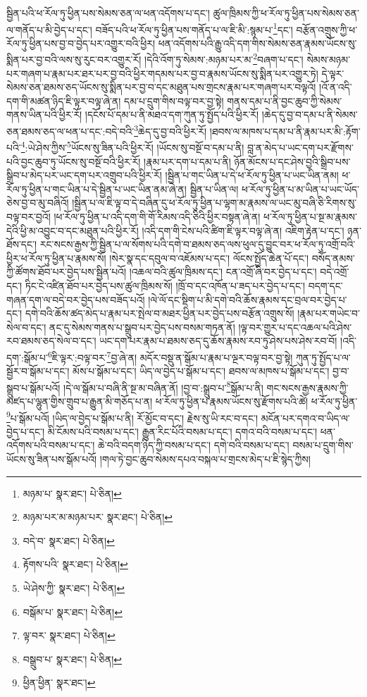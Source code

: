 སྦྱིན་པའི་ཕ་རོལ་ཏུ་ཕྱིན་པས་སེམས་ཅན་ལ་ཕན་འདོགས་པ་དང་། ཚུལ་ཁྲིམས་ཀྱི་ཕ་རོལ་ཏུ་ཕྱིན་པས་སེམས་ཅན་ལ་གནོད་པ་མི་བྱེད་པ་དང་། བཟོད་པའི་ཕ་རོལ་ཏུ་ཕྱིན་པས་གནོད་པ་ལ་ཇི་མི་:སྙམ་པ་\footnote{མཉམ་པ་  སྣར་ཐང་།  པེ་ཅིན། }དང་། བརྩོན་འགྲུས་ཀྱི་ཕ་རོལ་ཏུ་ཕྱིན་པས་བྱ་བ་བྱེད་པར་འགྱུར་བའི་ཕྱིར། ཕན་འདོགས་པའི་རྒྱུ་འདི་དག་གིས་སེམས་ཅན་རྣམས་ཡོངས་སུ་སྨིན་པར་བྱ་བའི་ལས་སུ་རུང་བར་འགྱུར་རོ། །དེའི་འོག་ཏུ་སེམས་:མཉམ་པར་མ་\footnote{མཉམ་པར་མ་མཉམ་པར་  སྣར་ཐང་།  པེ་ཅིན། }བཞག་པ་དང་། སེམས་མཉམ་པར་གཞག་པ་རྣམ་པར་ཐར་པར་བྱ་བའི་ཕྱིར་གདམས་པར་བྱ་བ་རྣམས་ཡོངས་སུ་སྨིན་པར་འགྱུར་ཏེ། དེ་ལྟར་སེམས་ཅན་ཐམས་ཅད་ཡོངས་སུ་སྨིན་པར་བྱ་བ་དང་མཐུན་པས་གྲངས་རྣམ་པར་གཞག་པར་བལྟའོ། །འོ་ན་འདི་དག་གི་མཚན་ཉིད་ཇི་ལྟར་བལྟ་ཞེ་ན། དམ་པ་དྲུག་གིས་བལྟ་བར་བྱ་སྟེ། གནས་དམ་པ་ནི་བྱང་ཆུབ་ཀྱི་སེམས་གནས་ཡིན་པའི་ཕྱིར་རོ། །དངོས་པོ་དམ་པ་ནི་མཐའ་དག་ཀུན་ཏུ་སྤྱོད་པའི་ཕྱིར་རོ། །ཆེད་དུ་བྱ་བ་དམ་པ་ནི་སེམས་ཅན་ཐམས་ཅད་ལ་ཕན་པ་དང་:བདེ་བའི་\footnote{བདེ་བ་  སྣར་ཐང་།  པེ་ཅིན། }ཆེད་དུ་བྱ་བའི་ཕྱིར་རོ། །ཐབས་ལ་མཁས་པ་དམ་པ་ནི་རྣམ་པར་མི་:རྟོག་པའི་\footnote{རྟོགས་པའི་  སྣར་ཐང་།  པེ་ཅིན། }:ཡེ་ཤེས་ཀྱིས་\footnote{ཡེ་ཤེས་ཀྱི་  སྣར་ཐང་།  པེ་ཅིན། }ཡོངས་སུ་ཟིན་པའི་ཕྱིར་རོ། །ཡོངས་སུ་བསྔོ་བ་དམ་པ་ནི། བླ་ན་མེད་པ་ཡང་དག་པར་རྫོགས་པའི་བྱང་ཆུབ་ཏུ་ཡོངས་སུ་བསྔོ་བའི་ཕྱིར་རོ། །རྣམ་པར་དག་པ་དམ་པ་ནི། ཉོན་མོངས་པ་དང་ཤེས་བྱའི་སྒྲིབ་པས་སྒྲིབ་པ་མེད་པར་ཡང་དག་པར་འགྲུབ་པའི་ཕྱིར་རོ། །སྦྱིན་པ་གང་ཡིན་པ་དེ་ཕ་རོལ་ཏུ་ཕྱིན་པ་ཡང་ཡིན་ནམ། ཕ་རོལ་ཏུ་ཕྱིན་པ་གང་ཡིན་པ་དེ་སྦྱིན་པ་ཡང་ཡིན་ནམ་ཞེ་ན། སྦྱིན་པ་ཡིན་ལ། ཕ་རོལ་ཏུ་ཕྱིན་པ་མ་ཡིན་པ་ཡང་ཡོད་ཅེས་བྱ་བ་མུ་བཞིའོ། །སྦྱིན་པ་ལ་ཇི་ལྟ་བ་དེ་བཞིན་དུ་ཕ་རོལ་ཏུ་ཕྱིན་པ་ལྷག་མ་རྣམས་ལ་ཡང་མུ་བཞི་ཅི་རིགས་སུ་བལྟ་བར་བྱའོ། །ཕ་རོལ་ཏུ་ཕྱིན་པ་འདི་དག་གི་གོ་རིམས་འདི་ཅིའི་ཕྱིར་བསྟན་ཞེ་ན། ཕ་རོལ་ཏུ་ཕྱིན་པ་སྔ་མ་རྣམས་དེའི་ཕྱི་མ་འབྱུང་བ་དང་མཐུན་པའི་ཕྱིར་རོ། །འདི་དག་གི་ངེས་པའི་ཚིག་ཇི་ལྟར་བལྟ་ཞེ་ན། འཇིག་རྟེན་པ་དང་། ཉན་ཐོས་དང་། རང་སངས་རྒྱས་ཀྱི་སྦྱིན་པ་ལ་སོགས་པའི་དགེ་བ་ཐམས་ཅད་ལས་ཕུལ་དུ་བྱུང་བར་ཕ་རོལ་ཏུ་འགྲོ་བའི་ཕྱིར་ཕ་རོལ་ཏུ་ཕྱིན་པ་རྣམས་སོ། །སེར་སྣ་དང་དབུལ་བ་འཇོམས་པ་དང་། ལོངས་སྤྱོད་ཆེན་པོ་དང་། བསོད་ནམས་ཀྱི་ཚོགས་ཐོབ་པར་བྱེད་པས་སྦྱིན་པའོ། །འཆལ་བའི་ཚུལ་ཁྲིམས་དང་། ངན་འགྲོ་ཞི་བར་བྱེད་པ་དང་། བདེ་འགྲོ་དང་། ཏིང་ངེ་འཛིན་ཐོབ་པར་བྱེད་པས་ཚུལ་ཁྲིམས་སོ། །ཁྲོ་བ་དང་འཁོན་པ་ཟད་པར་བྱེད་པ་དང་། བདག་དང་གཞན་དག་ལ་བདེ་བར་བྱེད་པས་བཟོད་པའོ། །ལེ་ལོ་དང་སྡིག་པ་མི་དགེ་བའི་ཆོས་རྣམས་དང་བྲལ་བར་བྱེད་པ་དང་། དགེ་བའི་ཆོས་ཚད་མེད་པ་རྣམ་པར་སྤེལ་བ་མཐར་ཕྱིན་པར་བྱེད་པས་བརྩོན་འགྲུས་སོ། །རྣམ་པར་གཡེང་བ་སེལ་བ་དང་། ནང་དུ་སེམས་གནས་པ་སྒྲུབ་པར་བྱེད་པས་བསམ་གཏན་ནོ། །ལྟ་བར་གྱུར་པ་དང་འཆལ་པའི་ཤེས་རབ་ཐམས་ཅད་སེལ་བ་དང་། ཡང་དག་པར་རྣམ་པ་ཐམས་ཅད་དུ་ཆོས་རྣམས་རབ་ཏུ་ཤེས་པས་ཤེས་རབ་བོ། །འདི་དག་:སྒོམ་པ་\footnote{བསྒོམ་པ་  སྣར་ཐང་།  པེ་ཅིན། }ཇི་ལྟར་:བལྟ་བར་\footnote{ལྟ་བར་  སྣར་ཐང་།  པེ་ཅིན། }བྱ་ཞེ་ན། མདོར་བསྡུ་ན་སྒོམ་པ་རྣམ་པ་ལྔར་བལྟ་བར་བྱ་སྟེ། ཀུན་ཏུ་སྤྱོད་པ་ལ་སྦྱོར་བ་སྒོམ་པ་དང་། མོས་པ་སྒོམ་པ་དང་། ཡིད་ལ་བྱེད་པ་སྒོམ་པ་དང་། ཐབས་ལ་མཁས་པ་སྒོམ་པ་དང་། བྱ་བ་སྒྲུབ་པ་སྒོམ་པའོ། །དེ་ལ་སྒོམ་པ་བཞི་ནི་སྔ་མ་བཞིན་ནོ། །བྱ་བ་:སྒྲུབ་པ་\footnote{བསྒྲུབ་པ་  སྣར་ཐང་།  པེ་ཅིན། }སྒོམ་པ་ནི། གང་སངས་རྒྱས་རྣམས་ཀྱི་མཛད་པ་ལྷུན་གྱིས་གྲུབ་པ་རྒྱུན་མི་གཅོད་པ་ན། ཕ་རོལ་ཏུ་ཕྱིན་པ་རྣམས་ཡོངས་སུ་རྫོགས་པའི་ཚེ། ཕ་རོལ་ཏུ་ཕྱིན་\footnote{ཕྱིན་ཕྱིན་  སྣར་ཐང་། }པ་སྒོམ་པའོ། །ཡིད་ལ་བྱེད་པ་སྒོམ་པ་ནི། རོ་མྱོང་བ་དང་། རྗེས་སུ་ཡི་རང་བ་དང་། མངོན་པར་དགའ་བ་ཡིད་ལ་བྱེད་པ་དང་། མི་ངོམས་པའི་བསམ་པ་དང་། རྒྱུན་རིང་པོའི་བསམ་པ་དང་། དགའ་བའི་བསམ་པ་དང་། ཕན་འདོགས་པའི་བསམ་པ་དང་། ཆེ་བའི་བདག་ཉིད་ཀྱི་བསམ་པ་དང་། དགེ་བའི་བསམ་པ་དང་། བསམ་པ་དྲུག་གིས་ཡོངས་སུ་ཟིན་པས་སྒོམ་པའོ། །གལ་ཏེ་བྱང་ཆུབ་སེམས་དཔའ་བསྐལ་པ་གྲངས་མེད་པ་ཇི་སྙེད་ཀྱིས། 
